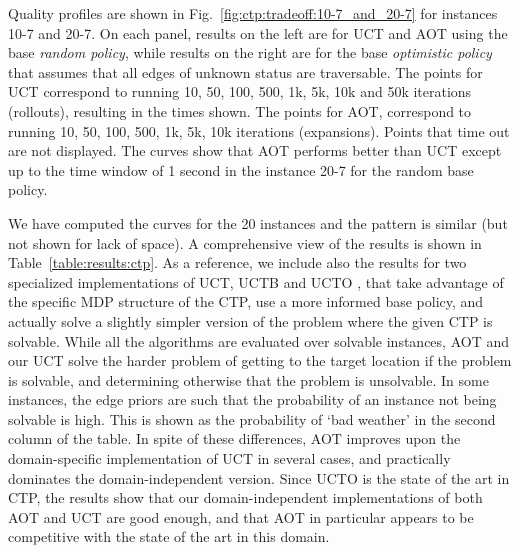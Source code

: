 \documentclass[letterpaper]{article}
\newcommand{\Omit}[1]{}
\begin{document}
Quality profiles are shown in Fig.~\ref{fig:ctp:tradeoff:10-7_and_20-7}
for instances 10-7 and 20-7.
On each panel, results on the left are for UCT and AOT using the base
\emph{random policy}, while results on the right are for the base \emph{optimistic policy}
that assumes that  all edges of unknown status are traversable.
The points for  UCT correspond to running 10, 50, 100, 500, 1k, 5k, 10k and 50k iterations (rollouts), 
resulting in the times shown. The points for  AOT, correspond to running  10, 50, 100, 500, 1k, 5k, 10k iterations (expansions). 
Points that time out are not displayed. %
The curves show  that AOT  performs better than  UCT
except up to the time window of 1 second in  the instance 20-7 for the random base policy.
\Omit{
window where AOT takes over. The first points for AOT appear later in time that the first ones
for UCT because while 10 iterations of UCT introduce at most 10 nodes in the graph,
10 iterations of AOT introduce up to $|A||S|$ nodes, where $A$ and $S$ are the number of 
actions and states. The curves show however  that the more expensive expansions in AOT 
can pay off.} 
We have computed the curves for the 20 instances and the pattern is similar (but not shown for lack of space).
A comprehensive view of the results  is shown in Table~\ref{table:results:ctp}.
As a reference, we include also  the results for  two specialized implementations of UCT, 
UCTB and UCTO  \cite{malte:ctp}, that take advantage of the specific MDP structure of the CTP, 
use a more informed base policy, and actually solve a slightly simpler version of the 
problem where the given CTP is solvable. While all the algorithms are evaluated over 
solvable instances, AOT and our UCT solve the harder problem of getting to the target 
location if the problem is solvable, and determining otherwise that the problem is unsolvable.
In some instances, the edge  priors are such that the  probability of an instance not being solvable
is high. This is shown as the probability of `bad weather' in the second column of the table.
In spite of these differences, AOT improves upon the domain-specific implementation
of UCT in several  cases, and practically dominates the domain-independent version.
Since UCTO is the state of the art in CTP, the  results show that 
our domain-independent implementations of both AOT and UCT 
are good enough, and that AOT in particular appears to be
competitive with the state of the art in this domain.
\end{document}
